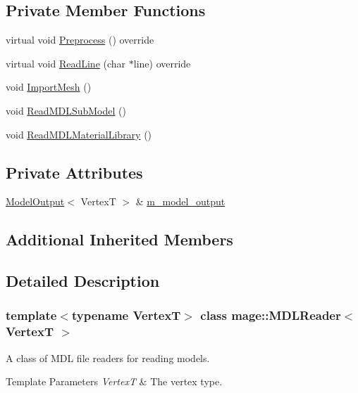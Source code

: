 \subsection*{Private Member Functions}
\begin{DoxyCompactItemize}
\item 
virtual void \hyperlink{classmage_1_1_m_d_l_reader_a8b99fb3bdea5e9dae156b135c160c22d}{Preprocess} () override
\item 
virtual void \hyperlink{classmage_1_1_m_d_l_reader_ac50f9cce64621b0a218b6778a611a702}{Read\+Line} (char $\ast$line) override
\item 
void \hyperlink{classmage_1_1_m_d_l_reader_ab688ce530cab867d155b696b2a1133a0}{Import\+Mesh} ()
\item 
void \hyperlink{classmage_1_1_m_d_l_reader_a78e12dbf59382cde7a56c323918d5bc2}{Read\+M\+D\+L\+Sub\+Model} ()
\item 
void \hyperlink{classmage_1_1_m_d_l_reader_a5fa8fa91dca9bea47a6bbf407e854be7}{Read\+M\+D\+L\+Material\+Library} ()
\end{DoxyCompactItemize}
\subsection*{Private Attributes}
\begin{DoxyCompactItemize}
\item 
\hyperlink{structmage_1_1_model_output}{Model\+Output}$<$ VertexT $>$ \& \hyperlink{classmage_1_1_m_d_l_reader_a41392308792749b78657497b69add850}{m\+\_\+model\+\_\+output}
\end{DoxyCompactItemize}
\subsection*{Additional Inherited Members}


\subsection{Detailed Description}
\subsubsection*{template$<$typename VertexT$>$\newline
class mage\+::\+M\+D\+L\+Reader$<$ Vertex\+T $>$}

A class of M\+DL file readers for reading models.


\begin{DoxyTemplParams}{Template Parameters}
{\em VertexT} & The vertex type. \\
\hline
\end{DoxyTemplParams}


